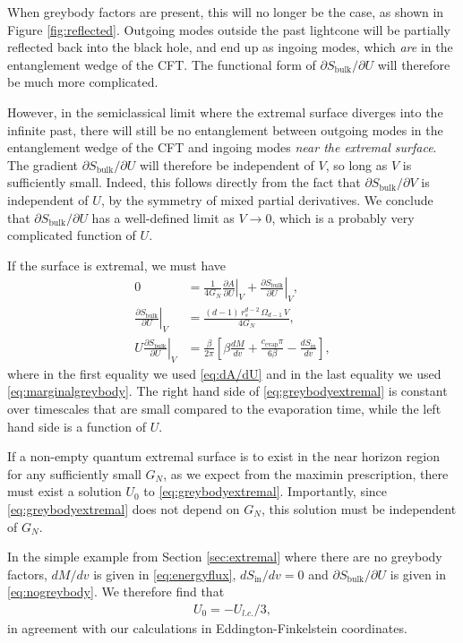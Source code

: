 \documentclass[11pt,a4paper]{article}
\begin{document}
When greybody factors are present, this will no longer be the case, as shown in Figure \ref{fig:reflected}. Outgoing modes outside the past lightcone will be partially reflected back into the black hole, and end up as ingoing modes, which \emph{are} in the entanglement wedge of the CFT. The functional form of $\partial S_\text{bulk}/\partial U$ will therefore be much more complicated. 

However, in the semiclassical limit where the extremal surface diverges into the infinite past, there will still be no entanglement between outgoing modes in the entanglement wedge of the CFT and ingoing modes \emph{near the extremal surface}. The gradient $\partial S_\text{bulk}/\partial U$ will therefore be independent of $V$, so long as $V$ is sufficiently small. Indeed, this follows directly from the fact that $\partial S_\text{bulk}/\partial V$ is independent of $U$, by the symmetry of mixed partial derivatives. We conclude that $\partial S_\text{bulk}/\partial U$ has a well-defined limit as $V \to 0$, which is a probably very complicated function of $U$.

If the surface is extremal, we must have
\begin{align}
0 &=\frac{1}{4 G_N} \left. \frac{\partial A}{\partial U} \right|_V + \left. \frac{\partial S_\text{bulk}}{\partial U} \right|_V,
\\  \left. \frac{\partial S_\text{bulk}}{\partial U} \right|_V & = \frac{(d-1)\, r_s^{d-2} \,\Omega_{d-1}\, V}{4 G_N},
\\ U \left. \frac{\partial S_\text{bulk}}{\partial U} \right|_V &= \frac{\beta}{2\pi}\left[\beta \frac{d M}{d v} + \frac{c_\text{evap} \pi}{6 \beta} - \frac{d S_\text{in}}{d v}\right], \label{eq:greybodyextremal}
\end{align}
where in the first equality we used \eqref{eq:dA/dU} and in the last equality we used \eqref{eq:marginalgreybody}. The right hand side of \eqref{eq:greybodyextremal} is constant over timescales that are small compared to the evaporation time, while the left hand side is a function of $U$. 

If a non-empty quantum extremal surface is to exist in the near horizon region for any sufficiently small $G_N$, as we expect from the maximin prescription, there must exist a solution $U_0$ to \eqref{eq:greybodyextremal}. Importantly, since \eqref{eq:greybodyextremal} does not depend on $G_N$, this solution must be independent of $G_N$.
 
 In the simple example from Section \ref{sec:extremal} where there are no greybody factors, $dM/dv$ is given in \eqref{eq:energyflux}, $dS_\text{in}/dv = 0$ and  $\partial S_\text{bulk}/\partial U$ is given in \eqref{eq:nogreybody}. We therefore find that
 \begin{align}
 U_0 = -U_{l.c.}/3,
 \end{align}
in agreement with our calculations in Eddington-Finkelstein coordinates.
\end{document}
